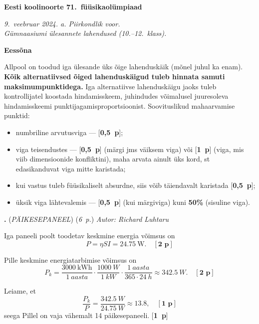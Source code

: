 \documentclass[11pt,a5paper]{article}
\newcommand{\numb}[1]{\vspace{5pt}\textbf{\large #1}}
\newcommand{\nimi}[1]{(\textsl{\small #1})}
\newcommand{\punktid}[1]{(\emph{#1~p.})}
\newcommand{\p}[1]{[\textbf{#1~p}]}
\newcounter{ylesanne}
\newcommand{\yl}[1]{\addtocounter{ylesanne}{1}\numb{\theylesanne.} \nimi{#1} \newblock{}}
\newcommand{\autor}[1]{\emph{Autor: #1}}%
\newenvironment{skeemlist}{\begin{itemize}[nosep, topsep=0pt, leftmargin=*]}{\end{itemize}}
\begin{document}
\normalsize
\begin{center}
  \textbf{\Large Eesti koolinoorte 71.\ füüsikaolümpiaad} \par
  \emph{9.\ veebruar 2024. a. Piirkondlik voor.\\ Gümnaasiumi ülesannete lahendused (10.--12.\ klass).}
\end{center}

\normalsize

\numb{Eessõna}

Allpool on toodud iga ülesande üks õige lahenduskäik (mõnel juhul ka enam). \textbf{Kõik alternatiivsed õiged lahenduskäigud tuleb hinnata samuti maksimumpunktidega.} Iga alternatiivse lahenduskäigu jaoks tuleb kontrollijatel koostada hindamisskeem, juhindudes võimalusel juuresoleva hindamisskeemi punktijagamisproportsioonist. Soovituslikud mahaarvamise punktid:
\begin{skeemlist}
  \item numbriline arvutusviga --- \p{0,5};
  \item viga teisendustes --- \p{0,5} (märgi jms väiksem viga) või \p{1} (viga, mis viib dimensioonide konfliktini), maha arvata ainult üks kord, st edasikanduvat viga mitte karistada;
  \item kui vastus tuleb füüsikaliselt absurdne, siis võib täiendavalt karistada \p{0,5};
  \item üksik viga lähtevalemis --- \p{0,5} (kui märgiviga) kuni \textbf{50\%} (sisuline viga).
\end{skeemlist}
\vspace{1em}

\yl{PÄIKESEPANEEL}
\punktid{6} \autor{Richard Luhtaru}

Iga paneeli poolt toodetav keskmine energia võimsus on
\begin{equation*}
    P = \eta S I = \SI{24.75}{\W}. \quad\p{2}
\end{equation*}

Pille keskmine energiatarbimise võimsus on
\begin{equation*}
    P_k = \frac{\SI{3000}{\kWh}}{\SI{1}{aasta}} \cdot \frac{\SI{1000}{W}}{\SI{1}{kW}}\cdot\frac{\SI{1}{aasta}}{\num{365}\cdot\SI{24}{h}} \approx \SI{342.5}{W}. \quad\p{2}
\end{equation*}

Leiame, et
\begin{equation*}
    \frac{P_k}{P} = \frac{\SI{342.5}{W}}{\SI{24.75}{W}} \approx \num{13.8}, \quad\p{1}
\end{equation*}
seega Pillel on vaja vähemalt 14 päikesepaneeli. \p{1}
\end{document}
